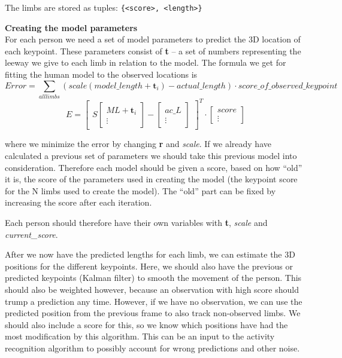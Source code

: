 \documentclass[a4paper]{article}
\begin{document}
The limbs are stored as tuples:
\texttt{\{<score>, <length>\}}

\textbf{Creating the model parameters} \\
For each person we need a set of model parameters to predict the 3D location of each keypoint. These parameters consist of \textbf{t} -- a set of numbers representing the leeway we give to each limb in relation to the model. The formula we get for fitting the human model to the observed locations is
\[
Error = \sum_{all limbs} (scale (model\_length + \textbf{t}_{i}) - actual\_length) \cdot score\_of\_observed\_keypoint
\]
\[
E = \begin{bmatrix}
  S \begin{bmatrix}
    ML + \textbf{t}_{i} \\ \vdots
  \end{bmatrix} -
  \begin{bmatrix}
    ac\_L \\ \vdots
  \end{bmatrix}

\end{bmatrix}^{T}\cdot
\begin{bmatrix}
  score \\ \vdots
\end{bmatrix}
\]

where we minimize the error by changing \textbf{r} and \emph{scale}. If we already have calculated a previous set of parameters we should take this previous model into consideration. Therefore each model should be given a score, based on how ``old'' it is, the score of the parameters used in creating the model (the keypoint score for the N limbs used to create the model). The ``old'' part can be fixed by increasing the score after each iteration.

Each person should therefore have their own variables with \textbf{t}, \emph{scale} and \emph{current\_score}.

After we now have the predicted lengths for each limb, we can estimate the 3D positions for the different keypoints. Here, we should also have the previous or predicted keypoints (Kalman filter) to smooth the movement of the person. This should also be weighted however, because an observation with high score should trump a prediction any time. However, if we have no observation, we can use the predicted position from the previous frame to also track non-observed limbs.
We should also include a score for this, so we know which positions have had the most modification by this algorithm. This can be an input to the activity recognition algorithm to possibly account for wrong predictions and other noise. 
\end{document}
